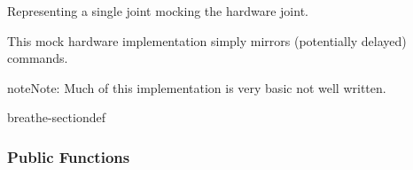 \documentclass[letterpaper,10pt,english]{sphinxmanual}
\begin{document}
\begin{fulllineitems}
\label{\detokenize{code/bioscara_hardware_drivers/index:_CPPv4N25bioscara_hardware_drivers25bioscara_hardware_drivers9MockJointE}}\label{\detokenize{code/bioscara_hardware_drivers/index:_CPPv3N25bioscara_hardware_drivers25bioscara_hardware_drivers9MockJointE}}\label{\detokenize{code/bioscara_hardware_drivers/index:_CPPv2N25bioscara_hardware_drivers25bioscara_hardware_drivers9MockJointE}}\label{\detokenize{code/bioscara_hardware_drivers/index:bioscara_hardware_drivers::bioscara_hardware_drivers::MockJoint}}
\pysigstartsignatures
\pysigstartmultiline
\pysigline
{\label{\detokenize{code/bioscara_hardware_drivers/index:classbioscara__hardware__drivers_1_1MockJoint}}}
\pysigstopmultiline
\pysigstopsignatures{}
\sphinxAtStartPar
Representing a single joint mocking the hardware joint. 

\sphinxAtStartPar
This mock hardware implementation simply mirrors (potentially delayed) commands.

\begin{sphinxadmonition}{note}{Note:}
\sphinxAtStartPar
Much of this implementation is very basic not well written. 
\end{sphinxadmonition}

\begin{sphinxuseclass}{breathe-sectiondef}\subsubsection*{Public Functions}


\end{sphinxuseclass}
\end{fulllineitems}
\end{document}
